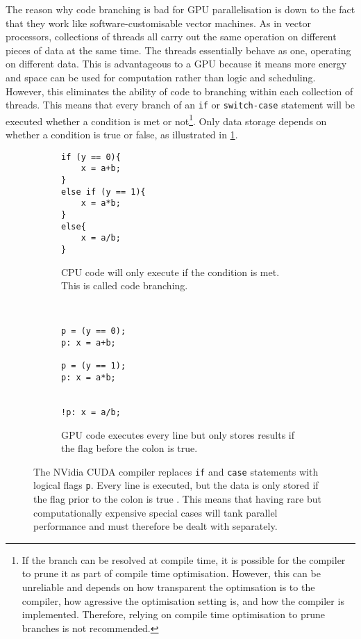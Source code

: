 The reason why code branching is bad for GPU parallelisation is down to the fact that they work like software-customisable vector machines. As in vector processors, collections of threads all carry out the same operation on different pieces of data at the same time. The threads essentially behave as one, operating on different data. This is advantageous to a GPU because it means more energy and space can be used for computation rather than logic and scheduling. However, this eliminates the ability of code to branching within each collection of threads. This means that every branch of an \texttt{if} or \texttt{switch-case} statement will be executed whether a condition is met or not\footnote{If the branch can be resolved at compile time, it is possible for the compiler to prune it as part of compile time optimisation. However, this can be unreliable and depends on how transparent the optimsation is to the compiler, how agressive the optimisation setting is, and how the compiler is implemented. Therefore, relying on compile time optimisation to prune branches is not recommended.}. Only data storage depends on whether a condition is true or false, as illustrated in \cref{f:code_branching}.
\begin{figure}
    \centering
    \begin{subfigure}[t]{0.48\linewidth}
        \centering
        \begin{verbatim}
if (y == 0){
    x = a+b;
}
else if (y == 1){
    x = a*b;
}
else{
    x = a/b;
}
			\end{verbatim}
        \caption{CPU code will only execute if the condition is met. This is called code branching.}
    \end{subfigure}
    ~
    \begin{subfigure}[t]{0.48\linewidth}
        \centering
        \begin{verbatim}
p = (y == 0);
p: x = a+b;

p = (y == 1);
p: x = a*b;


!p: x = a/b;
			\end{verbatim}
        \vspace{12pt}
        \caption{GPU code executes every line but only stores results if the flag before the colon is true.}
    \end{subfigure}
    \caption[Explanation of warp divergence.]{The NVidia CUDA compiler replaces \texttt{if} and \texttt{case} statements with logical flags \texttt{p}. Every line is executed, but the data is only stored if the flag prior to the colon is true \cite{nvidia}. This means that having rare but computationally expensive special cases will tank parallel performance and must therefore be dealt with separately.}
    \label{f:code_branching}
\end{figure}

